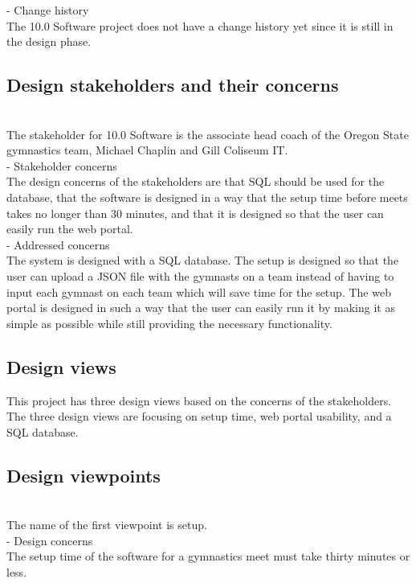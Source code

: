 \documentclass[letterpaper,10pt,draftclsnofoot,onecolumn,]{article}
\begin{document}
- Change history\\
The 10.0 Software project does not have a change history yet since it is still in the design phase.

\subsection{Design stakeholders and their concerns}
\\
The stakeholder for 10.0 Software is the associate head coach of the Oregon State gymnastics team, Michael Chaplin and Gill Coliseum IT.\\

- Stakeholder concerns\\
The design concerns of the stakeholders are that SQL should be used for the database, that the software is designed in a way that the setup time before meets takes no longer than 30 minutes, and that it is designed so that the user can easily run the web portal.\\

- Addressed concerns\\
The system is designed with a SQL database. The setup is designed so that the user can upload a JSON file with the gymnasts on a team instead of having to input each gymnast on each team which will save time for the setup. The web portal is designed in such a way that the user can easily run it by making it as simple as possible while still providing the necessary functionality.

\subsection{Design views}
This project has three design views based on the concerns of the stakeholders. The three design views are focusing on setup time, web portal usability, and a SQL database.

\subsection{Design viewpoints}
\\
The name of the first viewpoint is setup.\\

- Design concerns\\
The setup time of the software for a gymnastics meet must take thirty minutes or less.\\
\end{document}
